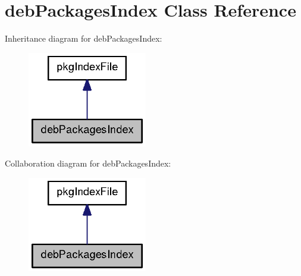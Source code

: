 \section{deb\-Packages\-Index \-Class \-Reference}
\label{classdebPackagesIndex}


\-Inheritance diagram for deb\-Packages\-Index\-:
\nopagebreak
\begin{figure}[H]
\begin{center}
\leavevmode
\includegraphics[width=148pt]{classdebPackagesIndex__inherit__graph}
\end{center}
\end{figure}


\-Collaboration diagram for deb\-Packages\-Index\-:
\nopagebreak
\begin{figure}[H]
\begin{center}
\leavevmode
\includegraphics[width=148pt]{classdebPackagesIndex__coll__graph}
\end{center}
\end{figure}
